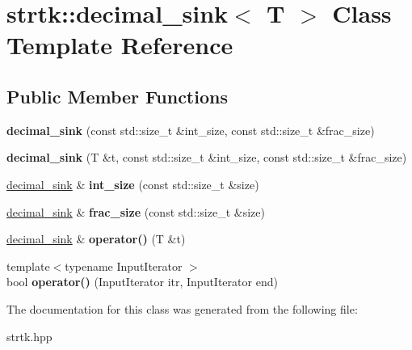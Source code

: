 \hypertarget{classstrtk_1_1decimal__sink}{\section{strtk\-:\-:decimal\-\_\-sink$<$ T $>$ Class Template Reference}
\label{classstrtk_1_1decimal__sink}
}
\subsection*{Public Member Functions}
\begin{DoxyCompactItemize}
\item 
\hypertarget{classstrtk_1_1decimal__sink_ac6977089427d56b187cfc43e1ec55b86}{{\bfseries decimal\-\_\-sink} (const std\-::size\-\_\-t \&int\-\_\-size, const std\-::size\-\_\-t \&frac\-\_\-size)}\label{classstrtk_1_1decimal__sink_ac6977089427d56b187cfc43e1ec55b86}

\item 
\hypertarget{classstrtk_1_1decimal__sink_aabb28e47b7ab7a734b00730ec1323b3b}{{\bfseries decimal\-\_\-sink} (T \&t, const std\-::size\-\_\-t \&int\-\_\-size, const std\-::size\-\_\-t \&frac\-\_\-size)}\label{classstrtk_1_1decimal__sink_aabb28e47b7ab7a734b00730ec1323b3b}

\item 
\hypertarget{classstrtk_1_1decimal__sink_aa262b81fa09e3fc8d0684b8963e40a93}{\hyperlink{classstrtk_1_1decimal__sink}{decimal\-\_\-sink} \& {\bfseries int\-\_\-size} (const std\-::size\-\_\-t \&size)}\label{classstrtk_1_1decimal__sink_aa262b81fa09e3fc8d0684b8963e40a93}

\item 
\hypertarget{classstrtk_1_1decimal__sink_a2fd63539f191ba2dd7b288de2a89b235}{\hyperlink{classstrtk_1_1decimal__sink}{decimal\-\_\-sink} \& {\bfseries frac\-\_\-size} (const std\-::size\-\_\-t \&size)}\label{classstrtk_1_1decimal__sink_a2fd63539f191ba2dd7b288de2a89b235}

\item 
\hypertarget{classstrtk_1_1decimal__sink_a3ed3ea8c3bf6993487da01bb66816563}{\hyperlink{classstrtk_1_1decimal__sink}{decimal\-\_\-sink} \& {\bfseries operator()} (T \&t)}\label{classstrtk_1_1decimal__sink_a3ed3ea8c3bf6993487da01bb66816563}

\item 
\hypertarget{classstrtk_1_1decimal__sink_a74b16e8e3f359d707298328a07e27c28}{{\footnotesize template$<$typename Input\-Iterator $>$ }\\bool {\bfseries operator()} (Input\-Iterator itr, Input\-Iterator end)}\label{classstrtk_1_1decimal__sink_a74b16e8e3f359d707298328a07e27c28}

\end{DoxyCompactItemize}


The documentation for this class was generated from the following file\-:\begin{DoxyCompactItemize}
\item 
strtk.\-hpp\end{DoxyCompactItemize}
